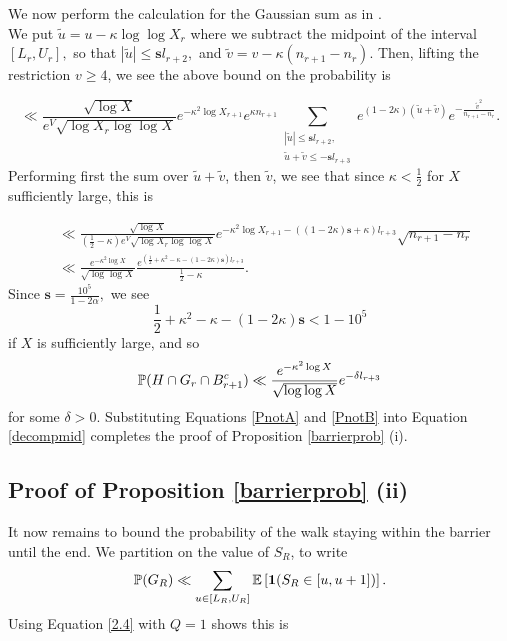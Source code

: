 \documentclass[12pt]{amsart}
\def\P{\ensuremath\mathbb{P}}
\def\E{\ensuremath\mathbb{E}}
\numberwithin{equation}{section}
\numberwithin{thm}{section}
\newcommand{\1}{\mathbf 1}
\begin{document}
We now perform the calculation for the Gaussian sum as in \cite{AB}.\\
We put $\tilde{u}=u-\kappa \log \log X_r$ where we subtract the midpoint of the interval $[L_r,U_r],$ so that $|\tilde{u}|\le \mathbf{s}l_{r+2},$ and $\tilde{v}=v-\kappa(n_{r+1}-n_{r}).$ Then, lifting the restriction $v\ge 4$, we see the above bound on the probability is

\begin{equation}
	\ll   \frac{\sqrt{\log X}}{e^V\sqrt{\log X_r\log\log X}}e^{-\kappa^2\log X_{r+1}}e^{\kappa n_{r+1}}\sum_{\substack{|\tilde{u}|\le \mathbf{s} l_{r+2},\\ \tilde{u}+\tilde{v} \le - \mathbf{s} l_{r+3}}}e^{(1-2\kappa)(\tilde{u}+\tilde{v})}e^{-\frac{\tilde{v}^2}{n_{r+1}-n_{r}}}.
\end{equation}
Performing first the sum over $\tilde{u}+\tilde{v}$, then $\tilde{v}$, we see that since $\kappa<\frac{1}{2}$ for $X$ sufficiently large, this is

\begin{align}
	&\nonumber\ll  \frac{\sqrt{\log X}}{(\frac{1}{2}-\kappa)e^V\sqrt{\log X_r\log\log X}} e^{-\kappa^2\log X_{r+1}-((1-2\kappa)\mathbf{s}+\kappa) l_{r+3}}\sqrt{n_{r+1}-n_{r}}\\
	&\ll \frac{e^{-\kappa^2\log X}}{\sqrt{\log\log X}} \frac{e^{\left(\frac{1}{2}+\kappa^2-\kappa-(1-2\kappa)\mathbf{s}\right)l_{r+3}}}{\frac{1}{2}-\kappa}.
\end{align}
Since $\mathbf{s}=\frac{10^5}{1-2\alpha},$ we see \begin{equation}\label{bound3}
	\frac{1}{2}+\kappa^2-\kappa-(1-2\kappa)\mathbf{s}<1-10^5
\end{equation}
if $X$ is sufficiently large, and so  \begin{equation}\label{PnotB}
\P(H\cap G_r\cap B_{r+1}^c)\ll \frac{e^{-\kappa^2\log X}}{\sqrt{\log\log X}} e^{-\delta l_{r+3}}\end{equation} for some $\delta>0$.
Substituting Equations \eqref{PnotA} and \eqref{PnotB} into Equation \eqref{decompmid} completes the proof of Proposition \ref{barrierprob} (i).
\subsection{Proof of Proposition \ref{barrierprob} (ii)}
It now remains to bound the probability of the walk staying within the barrier until the end. We partition on the value of $S_{R}$, to write
\begin{align}
	\P(G_{R})\ll \sum_{u\in [L_R,U_R]}\E\left[\mathbf{1}(S_R\in [u,u+1])\right].
\end{align}
Using Equation \eqref{2.4} with $Q=1$ shows this is
\end{document}
